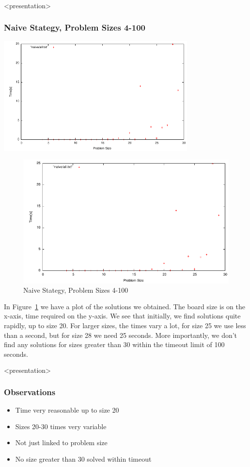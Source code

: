 \begin{frame}<presentation>
\frametitle{Naive Stategy, Problem Sizes 4-100}
\includegraphics[width=10cm]{../nqueen/naive/all}
\end{frame}

\begin{figure}[h]
\caption{\label{nqueen:naive} Naive Stategy, Problem Sizes 4-100}
\begin{center}
\includegraphics[width=12cm]{../nqueen/naive/all}
\end{center}
\end{figure}

In Figure~\ref{nqueen:naive} we have a plot of the solutions we obtained. The board size is on the x-axis, time required on the y-axis. We see that initially, we find solutions quite rapidly, up to size 20. For larger sizes, the times vary a lot, for size 25 we use less than a second, but for size 28 we need 25 seconds. More importantly, we don't find any solutions for sizes greater than 30 within the timeout limit of 100 seconds.

\begin{frame}<presentation>
\frametitle{Observations}
\begin{itemize}
\item Time very reasonable up to size 20
\item Sizes 20-30 times very variable
\item Not just linked to problem size
\item No size greater than 30 solved within timeout
\end{itemize}
\end{frame}

